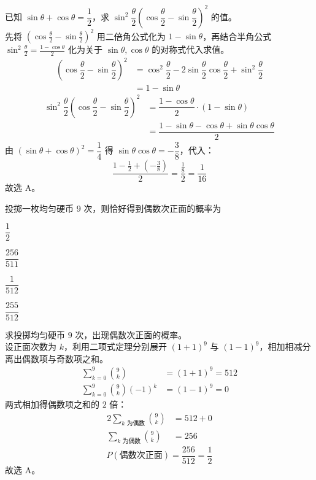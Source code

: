 \documentclass[12pt,a4paper]{exam-zh}
\begin{document}
\begin{solution}
    已知 $\sin\theta+\cos\theta=\dfrac{1}{2}$，求 $\sin^{2}\dfrac{\theta}{2}\left(\cos\dfrac{\theta}{2}-\sin\dfrac{\theta}{2}\right)^{2}$ 的值。\\
    先将 $\left(\cos\frac{\theta}{2}-\sin\frac{\theta}{2}\right)^2$ 用二倍角公式化为 $1-\sin\theta$，再结合半角公式 $\sin^2\frac{\theta}{2}=\frac{1-\cos\theta}{2}$ 化为关于 $\sin\theta,\cos\theta$ 的对称式代入求值。
    \begin{align*}
        \left(\cos\dfrac{\theta}{2}-\sin\dfrac{\theta}{2}\right)^{2} &= \cos^2\dfrac{\theta}{2}-2\sin\dfrac{\theta}{2}\cos\dfrac{\theta}{2}+\sin^2\dfrac{\theta}{2} \\
        &= 1-\sin\theta
    \end{align*}
    \begin{align*}
        \sin^{2}\dfrac{\theta}{2}\left(\cos\dfrac{\theta}{2}-\sin\dfrac{\theta}{2}\right)^{2} &= \dfrac{1-\cos\theta}{2}\cdot(1-\sin\theta) \\
        &= \dfrac{1-\sin\theta-\cos\theta+\sin\theta\cos\theta}{2}
    \end{align*}
    由 $(\sin\theta+\cos\theta)^2=\dfrac14$ 得 $\sin\theta\cos\theta=-\dfrac38$，代入：
    \[
        \dfrac{1-\frac12+\left(-\frac38\right)}{2} = \dfrac{\frac18}{2} = \dfrac{1}{16}
    \]
    故选 A。
\end{solution}

\begin{question}
    投掷一枚均匀硬币 $9$ 次，则恰好得到偶数次正面的概率为 \paren[A]
    \begin{choices}
        \item $\dfrac{1}{2}$
        \item $\dfrac{256}{511}$
        \item $\dfrac{1}{512}$
        \item $\dfrac{255}{512}$
    \end{choices}
\end{question}

\begin{solution}
    求投掷均匀硬币 $9$ 次，出现偶数次正面的概率。\\
    设正面次数为 $k$，利用二项式定理分别展开 $(1+1)^9$ 与 $(1-1)^9$，相加相减分离出偶数项与奇数项之和。
    \begin{align*}
        \sum_{k=0}^{9}\binom{9}{k} &= (1+1)^9 = 512 \\
        \sum_{k=0}^{9}\binom{9}{k}(-1)^k &= (1-1)^9 = 0
    \end{align*}
    两式相加得偶数项之和的 $2$ 倍：
    \begin{align*}
        2\sum_{k \text{ 为偶数}}\binom{9}{k} &= 512+0 \\
        \sum_{k \text{ 为偶数}}\binom{9}{k} &= 256
    \end{align*}
    \[
        P(\text{偶数次正面}) = \dfrac{256}{512} = \dfrac{1}{2}
    \]
    故选 A。
\end{solution}
\end{document}
